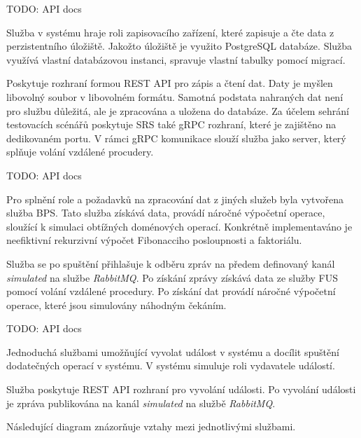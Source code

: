 TODO: API docs


Služba v systému hraje roli zapisovacího zařízení, které zapisuje a čte data z perzistentního úložiště. Jakožto úložiště je využito PostgreSQL databáze. Služba využívá vlastní databázovou instanci, spravuje vlastní tabulky pomocí migrací.

Poskytuje rozhraní formou REST API pro zápis a čtení dat. Daty je myšlen libovolný soubor v libovolném formátu. Samotná podstata nahraných dat není pro službu důležitá, ale je zpracována a uložena do databáze. Za účelem sehrání testovacích scénářů poskytuje SRS také gRPC rozhraní, které je zajištěno na dedikovaném portu. V rámci gRPC komunikace slouží služba jako server, který splňuje volání vzdálené procudery.

TODO: API docs


Pro splnění role a požadavků na zpracování dat z jiných služeb byla vytvořena služba BPS. Tato služba získává data, provádí náročné výpočetní operace, sloužící k simulaci obtížných doménových operací. Konkrétně implementaváno je neefiktivní rekurzivní výpočet Fibonacciho posloupnosti a faktoriálu.

Služba se po spuštění přihlašuje k odběru zpráv na předem definovaný kanál \emph{simulated} na službe \emph{RabbitMQ}. Po získání zprávy získává data ze služby FUS pomocí volání vzdálené procedury. Po získání dat provádí náročné výpočetní operace, které jsou simulovány náhodným čekáním.

TODO: API docs


Jednoduchá službami umožňující vyvolat událost v systému a docílit spuštění dodatečných operací v systému. V systému simuluje roli vydavatele událostí.

Služba poskytuje REST API rozhraní pro vyvolání události. Po vyvolání události je zpráva publikována na kanál \emph{simulated} na službě \emph{RabbitMQ}.



Následující diagram znázorňuje vztahy mezi jednotlivými službami.


